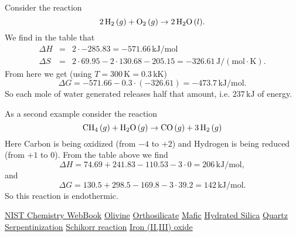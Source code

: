 \documentclass[a4paper,14pt]{extarticle}
\def\H{{\rm H}}
\def\O{{\rm O}}
\def\C{{\rm C}}
\begin{document}
Consider the reaction
\[
    2 \,\H_2 \,(g) + \O_2 \,(g) \rightarrow 2 \,\H_2\O \,(l).
\]
We find in the table that
\[
    \begin{array}{rcl}
        \Delta H &=& 2 \cdot -285.83 = -571.66 \,\text{kJ}/\text{mol} \\
        \Delta S &=& 2 \cdot 69.95 - 2 \cdot 130.68 - 205.15 = -326.61 \,\text{J}/(\text{mol}\cdot \text{K}).
    \end{array}
\]
From here we get (using $T = 300 \,\text{K} = 0.3 \,\text{kK}$)
\[
    \Delta G = -571.66 - 0.3 \cdot (-326.61) = -473.7 \,\text{kJ}/\text{mol}.
\]
So each mole of water generated releases half that amount, i.e. $237 \,\text{kJ}$ of energy.

As a second example consider the reaction
\[
    \C\H_4 \,(g)+ \H_2\O \,(g)\rightarrow \C\O \,(g)+ 3\,\H_2\,(g)
\]
Here Carbon is being oxidized (from $-4$ to $+2$) and Hydrogen is being reduced (from $+1$ to $0$).
From the table above we find
\[
    \Delta H = 74.69 + 241.83 - 110.53 - 3\cdot 0 = 206 \,\text{kJ}/\text{mol},
\]
and
\[
    \Delta G = 130.5 + 298.5 - 169.8 - 3\cdot 39.2 = 142 \,\text{kJ}/\text{mol}.
\]
So this reaction is endothermic.

\begin{thebibliography}{9}
                  \href{https://webbook.nist.gov/}{NIST Chemistry WebBook}
               \href{https://en.wikipedia.org/wiki/Olivine}{Olivine}
         \href{https://en.wikipedia.org/wiki/Orthosilicate}{Orthosilicate}
                 \href{https://en.wikipedia.org/wiki/Mafic}{Mafic}
       \href{https://en.wikipedia.org/wiki/Hydrated_silica}{Hydrated Silica}
                \href{https://en.wikipedia.org/wiki/Quartz}{Quartz}
      \href{https://en.wikipedia.org/wiki/Serpentinization}{Serpentinization}
     \href{https://en.wikipedia.org/wiki/Schikorr_reaction}{Schikorr reaction}
     \href{https://en.wikipedia.org/wiki/Iron(II,III)_oxide}{Iron (II,III) oxide}
\end{thebibliography}
\end{document}
